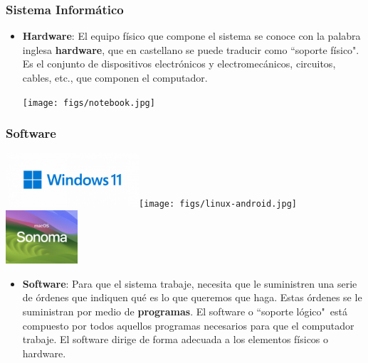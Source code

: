 \documentclass[aspectratio=169]{beamer}
\begin{document}
\begin{frame}[fragile]\frametitle{Sistema Informático}
\begin{itemize}
\item \textbf{Hardware}: El equipo físico que compone el sistema se conoce con la palabra inglesa \textbf{hardware}, que en castellano se puede traducir como ``soporte físico". Es el conjunto de dispositivos electrónicos y electromecánicos, circuitos, cables, etc., que componen el computador.
\begin{center}
\texttt{[image: figs/notebook.jpg]}
\end{center}
\end{itemize}
\end{frame}

\begin{frame}[fragile]\frametitle{Software}
\begin{center}
\includegraphics[height=2cm]{figs/windows-11-logo_web.png}\hfill\texttt{[image: figs/linux-android.jpg]}\hfill\includegraphics[height=2cm]{figs/macos-14-sonoma.png}
\end{center}
\begin{itemize}
\item \textbf{Software}: Para que el sistema trabaje, necesita que le suministren una serie de órdenes que indiquen qué es lo que queremos que haga. Estas órdenes se le suministran por medio de \textbf{programas}. El software o ``soporte lógico"\, está compuesto por todos aquellos programas necesarios para que el computador trabaje. El software dirige de forma adecuada a los elementos físicos o hardware.
\end{itemize}
\end{frame}
\end{document}
